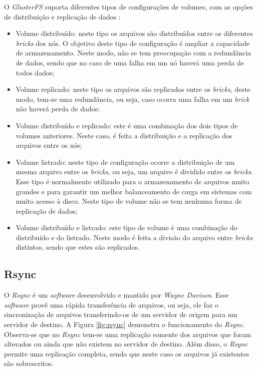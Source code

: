 O \textit{GlusterFS} suporta diferentes tipos de configurações de volumes, com as opções de distribuição e replicação de dados \cite{glusterfs}:
\begin{itemize}
 \item Volume distribuído: neste tipo os arquivos são distribuídos entre os diferentes \textit{bricks} dos nós. O objetivo deste tipo de 
 configuração é ampliar a capacidade de armazenamento. Neste modo, não se tem preocupação com a redundância de dados, sendo que no caso de uma
 falha em um nó haverá uma perda de todos dados;
 \item Volume replicado: neste tipo os arquivos são replicados entre os \textit{bricks}, deste modo, tem-se uma redundância, ou seja, caso ocorra
 uma falha em um \textit{brick} não haverá perda de dados;
 \item Volume distribuído e replicado: este é uma combinação dos dois tipos de volumes anteriores. Neste caso, é feita a distribuição 
 e a replicação dos arquivos entre os nós;
 \item Volume listrado: neste tipo de configuração ocorre a distribuição de um mesmo arquivo entre os \textit{bricks}, ou seja, um arquivo é 
 dividido entre os \textit{bricks}. Esse tipo é normalmente utilizado para o armazenamento de arquivos muito grandes e para garantir um melhor 
 balanceamento de carga em sistemas com muito acesso à disco. Neste tipo de volume não se tem nenhuma forma de replicação de dados;
 \item Volume distribuído e listrado: este tipo de volume é uma combinação do distribuído e do listrado. Neste modo é feita a divisão do arquivo 
 entre \textit{bricks} distintos, sendo que estes são replicados.
\end{itemize}

\subsection{Rsync}
\label{section:rsync}
O \textit{Rsync} \cite{rsync} é um \textit{software} desenvolvido e mantido por \textit{Wayne Davison}. Esse \textit{software} provê uma rápida
transferência de arquivos, ou seja, ele faz o sincronização de arquivos transferindo-os de um servidor de origem para um servidor de destino. 
A Figura \ref{fig:rsync} demonstra o funcionamento do \textit{Rsync}. Observa-se que no \textit{Rsync} tem-se uma replicação somente dos 
arquivos que foram alterados ou ainda que não existem no servidor de destino. Além disso, o \textit{Rsync} permite uma replicação completa, 
sendo que neste caso os arquivos já existentes são sobrescritos.

